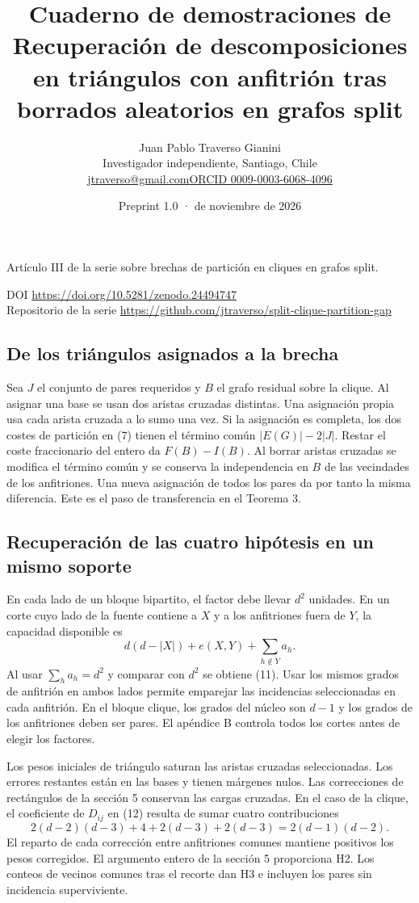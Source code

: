 \documentclass[spanish,11pt,a4paper]{article}
\title{Cuaderno de demostraciones de Recuperación de descomposiciones en triángulos con anfitrión tras borrados aleatorios en grafos split}
\author{Juan Pablo Traverso Gianini\\\small Investigador independiente, Santiago, Chile\\\small\href{mailto:jtraverso@gmail.com}{jtraverso@gmail.com}\quad\href{https://orcid.org/0009-0003-6068-4096}{ORCID 0009-0003-6068-4096}}
\date{Preprint 1.0 \enspace·\enspace 24 de noviembre de 2026}
\begin{document}
\raggedbottom\maketitle
\begin{center}Artículo III de la serie sobre brechas de partición en cliques en grafos split.\end{center}
\noindent DOI \url{https://doi.org/10.5281/zenodo.24494747}\\
Repositorio de la serie \url{https://github.com/jtraverso/split-clique-partition-gap}
\subsection{De los triángulos asignados a la brecha}\label{de-los-triuxe1ngulos-asignados-a-la-brecha}

Sea \(J\) el conjunto de pares requeridos y \(B\) el grafo residual sobre la clique. Al asignar una base se usan dos aristas cruzadas distintas. Una asignación propia usa cada arista cruzada a lo sumo una vez. Si la asignación es completa, los dos costes de partición en (7) tienen el término común \(|E(G)|-2|J|\). Restar el coste fraccionario del entero da \(F(B)-I(B)\). Al borrar aristas cruzadas se modifica el término común y se conserva la independencia en \(B\) de las vecindades de los anfitriones. Una nueva asignación de todos los pares da por tanto la misma diferencia. Este es el paso de transferencia en el Teorema 3.

\subsection{Recuperación de las cuatro hipótesis en un mismo soporte}\label{recuperaciuxf3n-de-las-cuatro-hipuxf3tesis-en-un-mismo-soporte}

En cada lado de un bloque bipartito, el factor debe llevar \(d^2\) unidades. En un corte cuyo lado de la fuente contiene a \(X\) y a los anfitriones fuera de \(Y\), la capacidad disponible es \[d(d-|X|)+e(X,Y)+\sum_{h\notin Y}a_h.\] Al usar \(\sum_h a_h=d^2\) y comparar con \(d^2\) se obtiene (11). Usar los mismos grados de anfitrión en ambos lados permite emparejar las incidencias seleccionadas en cada anfitrión. En el bloque clique, los grados del núcleo son \(d-1\) y los grados de los anfitriones deben ser pares. El apéndice B controla todos los cortes antes de elegir los factores.

Los pesos iniciales de triángulo saturan las aristas cruzadas seleccionadas. Los errores restantes están en las bases y tienen márgenes nulos. Las correcciones de rectángulos de la sección 5 conservan las cargas cruzadas. En el caso de la clique, el coeficiente de \(D_{ij}\) en (12) resulta de sumar cuatro contribuciones \[2(d-2)(d-3)+4+2(d-3)+2(d-3)=2(d-1)(d-2).\] El reparto de cada corrección entre anfitriones comunes mantiene positivos los pesos corregidos. El argumento entero de la sección 5 proporciona H2. Los conteos de vecinos comunes tras el recorte dan H3 e incluyen los pares sin incidencia superviviente.
\end{document}
